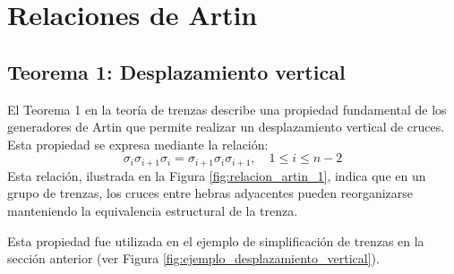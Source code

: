 

\section{Relaciones de Artin}

\subsection{Teorema 1: Desplazamiento vertical}

El Teorema 1 en la teoría de trenzas describe una propiedad fundamental de los generadores de Artin que permite realizar un desplazamiento vertical de cruces. Esta propiedad se expresa mediante la relación:
\[
\sigma_i \sigma_{i+1} \sigma_i = \sigma_{i+1} \sigma_i \sigma_{i+1}, \quad 1 \leq i \leq n - 2
\]
Esta relación, ilustrada en la Figura \ref{fig:relacion_artin_1}, indica que en un grupo de trenzas, los cruces entre hebras adyacentes pueden reorganizarse manteniendo la equivalencia estructural de la trenza.

Esta propiedad fue utilizada en el ejemplo de simplificación de trenzas en la sección anterior (ver Figura \ref{fig:ejemplo_desplazamiento_vertical}).

